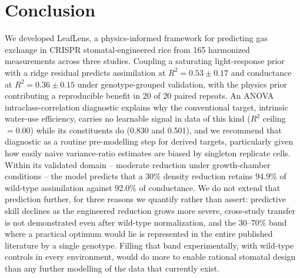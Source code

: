 \documentclass[runningheads]{llncs}
\begin{document}
\section{Conclusion}\label{sec:conclusion}

We developed LeafLens, a physics-informed framework for predicting gas exchange in CRISPR stomatal-engineered rice from 165 harmonized measurements across three studies. Coupling a saturating light-response prior with a ridge residual predicts assimilation at $R^{2}=0.53\pm0.17$ and conductance at $R^{2}=0.36\pm0.15$ under genotype-grouped validation, with the physics prior contributing a reproducible benefit in 20 of 20 paired repeats. An ANOVA intraclass-correlation diagnostic explains why the conventional target, intrinsic water-use efficiency, carries no learnable signal in data of this kind ($R^2$ ceiling $=0.00$) while its constituents do (0.830 and 0.501), and we recommend that diagnostic as a routine pre-modelling step for derived targets, particularly given how easily naive variance-ratio estimates are biased by singleton replicate cells. Within its validated domain -- moderate reduction under growth-chamber conditions -- the model predicts that a 30\% density reduction retains 94.9\% of wild-type assimilation against 92.0\% of conductance. We do not extend that prediction further, for three reasons we quantify rather than assert: predictive skill declines as the engineered reduction grows more severe, cross-study transfer is not demonstrated even after wild-type normalization, and the 30--70\% band where a practical optimum would lie is represented in the entire published literature by a single genotype. Filling that band experimentally, with wild-type controls in every environment, would do more to enable rational stomatal design than any further modelling of the data that currently exist.
\end{document}
